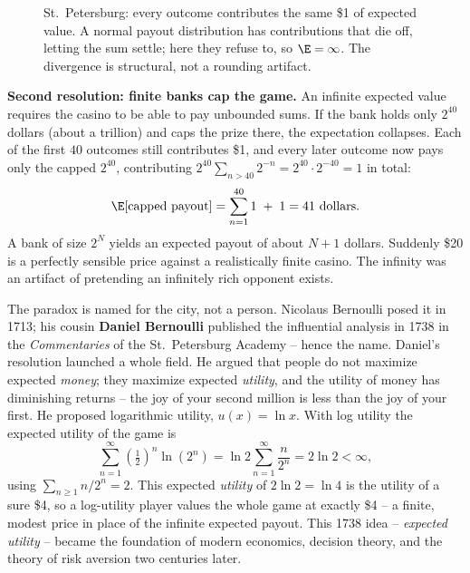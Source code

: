 \begin{figure}[H]
\centering
{}
\caption{St.\ Petersburg: every outcome contributes the same \$1 of expected
value. A normal payout distribution has contributions that die off, letting the
sum settle; here they refuse to, so $\E = \infty$. The divergence is structural,
not a rounding artifact.}
\label{ch08:fig-stpete}
\end{figure}

\begin{happeningbox}
\textbf{Second resolution: finite banks cap the game.} An infinite expected value
requires the casino to be able to pay unbounded sums. If the bank holds only
$2^{40}$ dollars (about a trillion) and caps the prize there, the expectation
collapses. Each of the first $40$ outcomes still contributes \$1, and every later
outcome now pays only the capped $2^{40}$, contributing $2^{40}\sum_{n>40}2^{-n}
= 2^{40}\cdot 2^{-40} = 1$ in total:
\[
  \E[\text{capped payout}] = \sum_{n=1}^{40} 1 \;+\; 1 = 41 \text{ dollars}.
\]
A bank of size $2^N$ yields an expected payout of about $N+1$ dollars. Suddenly \$20
is a perfectly sensible price against a realistically finite casino. The infinity
was an artifact of pretending an infinitely rich opponent exists.
\end{happeningbox}

\begin{historybox}
The paradox is named for the city, not a person. Nicolaus Bernoulli posed it in
1713; his cousin \textbf{Daniel Bernoulli} published the influential analysis in
1738 in the \emph{Commentaries} of the St.\ Petersburg Academy -- hence the name.
Daniel's resolution launched a whole field. He argued that people do not maximize
expected \emph{money}; they maximize expected \emph{utility}, and the utility of
money has diminishing returns -- the joy of your second million is less than the
joy of your first. He proposed logarithmic utility, $u(x) = \ln x$. With log
utility the expected utility of the game is
\[
  \sum_{n=1}^\infty \left(\tfrac12\right)^n \ln(2^n)
  = \ln 2 \sum_{n=1}^\infty \frac{n}{2^n} = 2\ln 2 < \infty,
\]
using $\sum_{n\ge1} n/2^n = 2$. This expected \emph{utility} of $2\ln 2 = \ln 4$
is the utility of a sure \$4, so a log-utility player values the whole game at
exactly \$4 -- a finite, modest price in place of the infinite expected payout. This
1738 idea -- \emph{expected utility} -- became the foundation of modern economics,
decision theory, and the theory of risk aversion two centuries later.
\end{historybox}

